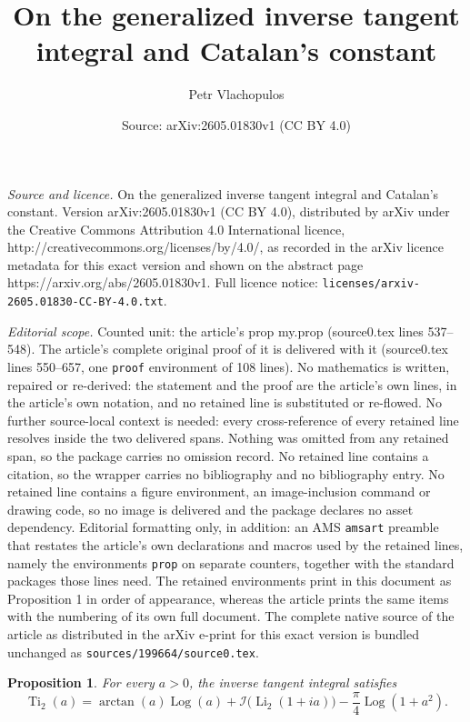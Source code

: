 \documentclass[10pt,a4paper]{amsart}
\title{On the generalized inverse tangent integral and Catalan’s constant}
\author{Petr Vlachopulos}
\date{Source: arXiv:2605.01830v1 (CC BY 4.0)}
\newtheorem{prop}{Proposition}
\begin{document}
\maketitle

\noindent\emph{Source and licence.} On the generalized inverse tangent integral and Catalan’s constant. Version arXiv:2605.01830v1 (CC BY 4.0), distributed by arXiv under the Creative Commons Attribution 4.0 International licence, http://creativecommons.org/licenses/by/4.0/, as recorded in the arXiv licence metadata for this exact version and shown on the abstract page https://arxiv.org/abs/2605.01830v1. Full licence notice: \texttt{licenses/arxiv-2605.01830-CC-BY-4.0.txt}.\par\smallskip

\noindent\textit{Editorial scope.} Counted unit: the article's prop my.prop (source0.tex lines 537--548). The article's complete original proof of it is delivered with it (source0.tex lines 550--657, one \texttt{proof} environment of 108 lines). No mathematics is written, repaired or re-derived: the statement and the proof are the article's own lines, in the article's own notation, and no retained line is substituted or re-flowed.  No further source-local context is needed: every cross-reference of every retained line resolves inside the two delivered spans.  Nothing was omitted from any retained span, so the package carries no omission record.  No retained line contains a citation, so the wrapper carries no bibliography and no bibliography entry.  No retained line contains a figure environment, an image-inclusion command or drawing code, so no image is delivered and the package declares no asset dependency.  Editorial formatting only, in addition: an AMS \texttt{amsart} preamble that restates the article's own declarations and macros used by the retained lines, namely the environments \texttt{prop} on separate counters, together with the standard packages those lines need.  The retained environments print in this document as Proposition 1 in order of appearance, whereas the article prints the same items with the numbering of its own full document.  The complete native source of the article as distributed in the arXiv e-print for this exact version is bundled unchanged as \texttt{sources/199664/source0.tex}.
\begin{prop}
\label{my.prop}
For every \(a>0\), the inverse tangent integral satisfies
\begin{equation}
\operatorname{Ti}_2(a)
=
\arctan(a)\operatorname{Log}(a)
+
\mathscr{I}\!\bigl(\operatorname{Li}_2(1+ia)\bigr)
-\frac{\pi}{4}\operatorname{Log}(1+a^2).
\end{equation}
\end{prop}
\end{document}
